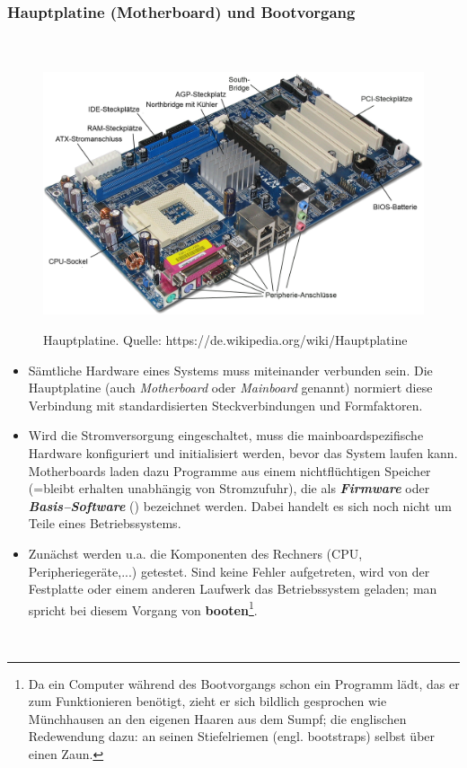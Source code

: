\subsubsection{Hauptplatine (Motherboard) und Bootvorgang}
	\begin{figure}[h!]
		\centering
		~\\~\\
		\includegraphics[width=0.5\linewidth]{./media/motherboard} \\
		\caption[Hauptplatine]{Hauptplatine. Quelle: https://de.wikipedia.org/wiki/Hauptplatine}
	\end{figure}
	\begin{itemize}
		\item Sämtliche Hardware eines Systems muss miteinander verbunden sein. Die Hauptplatine (auch \textit{Motherboard} oder \textit{Mainboard} genannt) normiert diese Verbindung mit standardisierten Steckverbindungen und Formfaktoren.
		\item Wird die Stromversorgung eingeschaltet, muss die mainboardspezifische Hardware konfiguriert und initialisiert werden, bevor das System laufen kann. Motherboards laden dazu Programme aus einem nichtflüchtigen Speicher (=bleibt erhalten unabhängig von Stromzufuhr), die als \textbf{\textit{Firmware}} oder \textbf{\textit{Basis--Software}} (\cite[2.1]{gumm2}) bezeichnet werden. Dabei handelt es sich noch nicht um Teile eines Betriebssystems.
		\item Zunächst werden u.a. die Komponenten des Rechners (CPU, Peripheriegeräte,...) getestet. Sind keine Fehler aufgetreten, wird von der Festplatte oder einem anderen Laufwerk das Betriebssystem geladen; man spricht bei diesem Vorgang von \textbf{booten}\footnote{Da ein Computer während des Bootvorgangs schon ein Programm lädt, das er zum Funktionieren benötigt, zieht er sich bildlich gesprochen wie Münchhausen an den eigenen Haaren aus dem Sumpf; die englischen Redewendung dazu: an seinen Stiefelriemen (engl. bootstraps) selbst über einen Zaun.}.
	\end{itemize}
%
~\\
